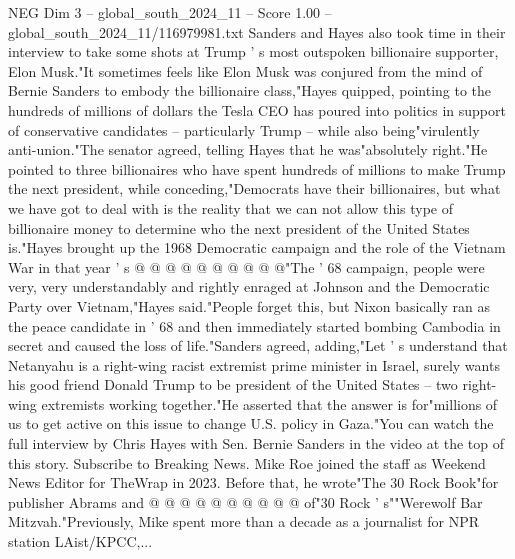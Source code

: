 \begin{textsample}{NEG Dim 3 – global\_south\_2024\_11 – Score 1.00 – global\_south\_2024\_11/116979981.txt}
Sanders and Hayes also took time in their interview to take some shots at Trump ' s most outspoken billionaire supporter, Elon Musk."It sometimes feels like Elon Musk was conjured from the mind of Bernie Sanders to embody the billionaire class,"Hayes quipped, pointing to the hundreds of millions of dollars the Tesla CEO has poured into politics in support of conservative candidates -- particularly Trump -- while also being"virulently anti-union."The senator agreed, telling Hayes that he was"absolutely right."He pointed to three billionaires who have spent hundreds of millions to make Trump the next president, while conceding,"Democrats have their billionaires, but what we have got to deal with is the reality that we can not allow this type of billionaire money to determine who the next president of the United States is."Hayes brought up the 1968 Democratic campaign and the role of the Vietnam War in that year ' s @ @ @ @ @ @ @ @ @ @"The ' 68 campaign, people were very, very understandably and rightly enraged at Johnson and the Democratic Party over Vietnam,"Hayes said."People forget this, but Nixon basically ran as the peace candidate in ' 68 and then immediately started bombing Cambodia in secret and caused the loss of life."Sanders agreed, adding,"Let ' s understand that Netanyahu is a right-wing racist extremist prime minister in Israel, surely wants his good friend Donald Trump to be president of the United States -- two right-wing extremists working together."He asserted that the answer is for"millions of us to get active on this issue to change U.S. policy in Gaza."You can watch the full interview by Chris Hayes with Sen.
Bernie Sanders in the video at the top of this story.
Subscribe to Breaking News.
Mike Roe joined the staff as Weekend News Editor for TheWrap in 2023.
Before that, he wrote"The 30 Rock Book"for publisher Abrams and @ @ @ @ @ @ @ @ @ @ of"30 Rock ' s""Werewolf Bar Mitzvah."Previously, Mike spent more than a decade as a journalist for NPR station LAist/KPCC,...

\end{textsample}
